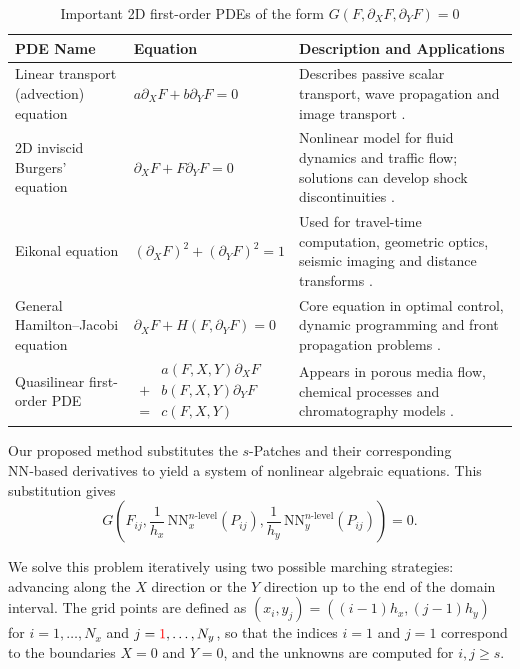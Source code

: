 \documentclass[pdflatex,sn-mathphys-num]{sn-jnl}%
\newcommand{\rev}[1]{\textcolor{red}{#1}}
\theoremstyle{thmstyleone}%
\theoremstyle{thmstyletwo}%
\theoremstyle{thmstylethree}%
\begin{document}
{\begin{table}[htbp]
\centering
\caption{Important 2D first-order PDEs of the form $G(F,\partial_X F,\partial_Y F)=0$}
\label{tab:5}
\begin{tabular}{l l p{5.5cm}}
\hline
PDE Name & Equation & Description and Applications \\
\hline
Linear transport (advection) equation &
$a\partial_X F+b\partial_Y F=0$
& Describes passive scalar transport, wave propagation and image transport \cite{Sun2025,Chen2021}. \\
\hline
2D inviscid Burgers' equation &
$\partial_X F+F\partial_Y F=0$
& Nonlinear model for fluid dynamics and traffic flow; solutions can develop shock discontinuities \cite{Yang2011}. \\
\hline
Eikonal equation &
$\left(\partial_X F\right)^2+\left(\partial_Y F\right)^2 = 1$
& Used for travel-time computation, geometric optics, seismic imaging and distance transforms \cite{Grimshaw1968,Yuxiao2025}. \\
\hline
General Hamilton--Jacobi equation &
$\partial_X F+H\left(F,\partial_Y F\right)=0$
& Core equation in optimal control, dynamic programming and front propagation problems \cite{Crandall1983}. \\
\hline
Quasilinear first-order PDE &
$\begin{aligned}
&a(F,X,Y)\partial_X F\\
+& b(F,X,Y)\partial_Y F \\
=& c(F,X,Y)
\end{aligned}$
& Appears in porous media flow, chemical processes and chromatography models \cite{Bouchut2024,Tucciarelli2004}. \\
\hline
\end{tabular}
\end{table}
Our proposed method substitutes the $s$-Patches and their corresponding NN‑based derivatives to yield a system of nonlinear algebraic equations. This substitution gives
\begin{equation}\label{22}
G\left(F_{ij},\frac{1}{h_x}\,\mathrm{NN}^{n\text{-level}}_x(P_{ij}),\frac{1}{h_y}\,\mathrm{NN}^{n\text{-level}}_y(P_{ij})\right)=0.
\end{equation}

We solve this problem iteratively using two possible marching strategies: advancing along the $X$ direction or the $Y$ direction up to the end of the domain interval. The grid points are defined as $(x_i,y_j)=({(i-1)} h_x,(j-1) h_y)$ for $i={1},\ldots,N_x$ and $j=\rev{1},\ldots,N_y$, so that the indices $i=1$ and $j=1$ correspond to the boundaries $X=0$ and $Y=0$, and the unknowns are computed for $i,j\ge s$.

}
\end{document}
